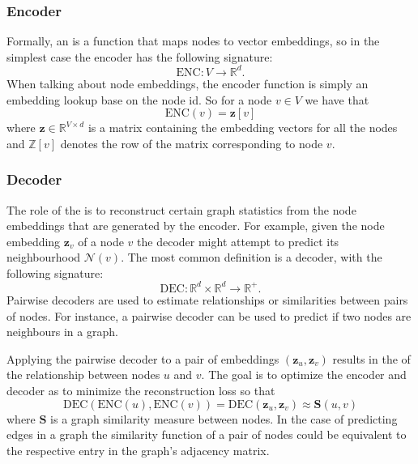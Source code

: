 

\subsubsection{Encoder}
Formally, an  is a function that maps nodes to vector embeddings, so in the simplest case the encoder has the following signature:
\begin{equation*}
    \text{ENC}: V \to \mathbb{R}^d.
\end{equation*}
When talking about  node embeddings, the encoder function is simply an embedding lookup base on the node id. So for a node $v\in V$ we have that
\begin{equation}\label{eq:encoderLookup}
    \text{ENC}(v) = \mathbf{z}[v]
\end{equation}
where $\mathbf{z}\in \mathbb{R}^{V\times d}$ is a matrix containing the embedding vectors for all the nodes and $\mathbb{Z}[v]$ denotes the row of the matrix corresponding to node $v$.\

\subsubsection{Decoder}\label{sec:decoder}
The role of the  is to reconstruct certain graph statistics from the node embeddings that are generated by the encoder. For example, given the node embedding $\mathbf{z}_v$ of a node $v$ the decoder might attempt to predict its neighbourhood $\mathcal{N}(v)$.
The most common definition is a  decoder, with the following signature:
\begin{equation*}
    \text{DEC}: \mathbb{R}^d \times \mathbb{R}^d \to \mathbb{R}^+.
\end{equation*}
Pairwise decoders are used to estimate relationships or similarities between pairs of nodes. For instance, a pairwise decoder can be used to predict if two nodes are neighbours in a graph.

Applying the pairwise decoder to a pair of embeddings $(\mathbf{z}_u, \mathbf{z}_v)$ results in the  of the relationship between nodes $u$ and $v$. The goal is to optimize the encoder and decoder as to minimize the reconstruction loss so that
\begin{equation}\label{eq:reconstruction}
    \text{DEC}(\text{ENC}(u), \text{ENC}(v)) = \text{DEC}(\mathbf{z}_u, \mathbf{z}_v) \approx \textbf{S}(u,v)
\end{equation}
where $\textbf{S}$ is a graph similarity measure between nodes. In the case of predicting edges in a graph the similarity function of a pair of nodes could be equivalent to the respective entry in the graph's adjacency matrix.

